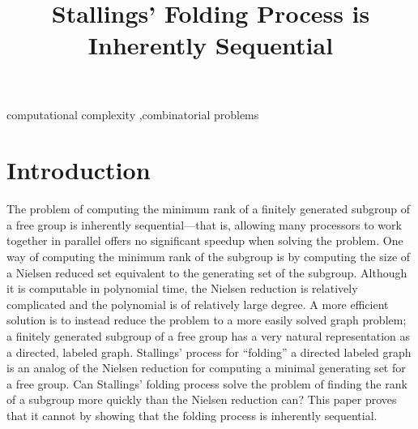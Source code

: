 \documentclass{elsarticlenonatbib}
\begin{document}
\begin{frontmatter}

  \title{Stallings' Folding Process is Inherently Sequential}

  \address[j]{Boston University \\ Computer Science Department \\ 111 Cummington Mall \\ Boston, MA 02215 \\ + () }

  \begin{keyword}
    computational complexity \sep combinatorial problems
  \end{keyword}

\end{frontmatter}

\section{Introduction}

The problem of computing the minimum rank of a finitely generated subgroup of a free group is inherently sequential---that is, allowing many processors to work together in parallel offers no significant speedup when solving the problem.
One way of computing the minimum rank of the subgroup is by computing the size of a Nielsen reduced set equivalent to the generating set of the subgroup.
Although it is computable in polynomial time, the Nielsen reduction is relatively complicated and the polynomial is of relatively large degree.
A more efficient solution is to instead reduce the problem to a more easily solved graph problem; a finitely generated subgroup of a free group has a very natural representation as a directed, labeled graph.
Stallings' process for ``folding'' a directed labeled graph \cite[Algorithm~5.4]{stallings83} is an analog of the Nielsen reduction for computing a minimal generating set for a free group.
Can Stallings' folding process solve the problem of finding the rank of a subgroup more quickly than the Nielsen reduction can?
This paper proves that it cannot by showing that the folding process is inherently sequential.
\end{document}

